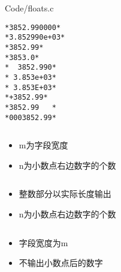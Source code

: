 \begin{frame}

{Code/floats.c}
\end{frame}

\begin{frame}[fragile]
\begin{lstlisting}[showspaces=true,backgroundcolor=\color{red!20}]
*3852.990000*
*3.852990e+03*
*3852.99*
*3853.0*
*  3852.990*
* 3.853e+03*
* 3.853E+03*
*+3852.99*
*3852.99   *
*0003852.99*
\end{lstlisting}
\end{frame}

\begin{frame}[fragile]
\begin{lstlisting}[backgroundcolor=\color{red!20}]
%m.nf     %m.ne      %m.nE
\end{lstlisting}

\begin{itemize}
\item \tf m为字段宽度
\item n为小数点右边数字的个数
\end{itemize}
\end{frame}

\begin{frame}[fragile]
\begin{lstlisting}[backgroundcolor=\color{red!20}] 
%.nf
\end{lstlisting}

\begin{itemize}
\item \tf 整数部分以实际长度输出
\item n为小数点右边数字的个数
\end{itemize}
\end{frame}

\begin{frame}[fragile]
\begin{lstlisting}[backgroundcolor=\color{red!20}] 
%m.f
\end{lstlisting}

\begin{itemize}
\item \tf 字段宽度为m
\item 不输出小数点后的数字
\end{itemize}
\end{frame}

